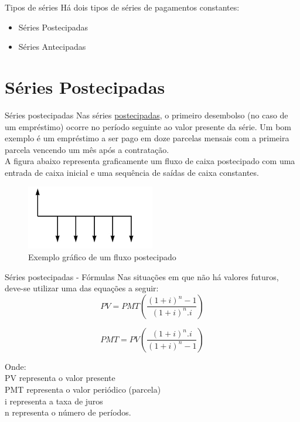 \documentclass[10pt]{beamer}
\begin{document}
\begin{frame}[fragile]{Tipos de séries}
Há dois tipos de séries de pagamentos constantes: \\
\begin{itemize}
  \item Séries Postecipadas
  \item Séries Antecipadas
\end{itemize}
\end{frame}

\section{Séries Postecipadas}

\begin{frame}[fragile]{Séries postecipadas}
Nas séries \underline{postecipadas}, o primeiro desembolso (no caso de um empréstimo) ocorre no período seguinte ao valor presente da série. Um bom exemplo é um empréstimo a ser pago em doze parcelas mensais com a primeira parcela vencendo um mês após a contratação.\\
A figura abaixo representa graficamente um fluxo de caixa postecipado com uma entrada de caixa inicial e uma sequência de saídas de caixa constantes.
\begin{figure}
  \begin{center}
    \includegraphics[width=0.5\textwidth]{Fluxopostecipado.jpg}
    \caption{Exemplo gráfico de um fluxo postecipado}
    \label{fig:Fluxopostecipado}
  \end{center}
\end{figure}
\end{frame}

\begin{frame}{Séries postecipadas - Fórmulas}
Nas situações em que não há valores futuros, deve-se utilizar uma das equações a seguir:
  \begin{equation*}
    PV = PMT \left( \frac{ ( 1 + i ) ^{n} - 1 }{ ( 1 + i ) ^{n} . i } \right) 
  \end{equation*}

  \begin{equation*}
    PMT = PV \left( \frac{ ( 1 + i ) ^{n} .i }{ ( 1 + i ) ^{n} - 1 } \right) 
  \end{equation*}

\tiny Onde: \\   PV representa o valor presente \\ PMT representa o valor periódico (parcela) \\ i representa a taxa de juros \\ n representa o número de períodos.
\end{frame}
\end{document}
